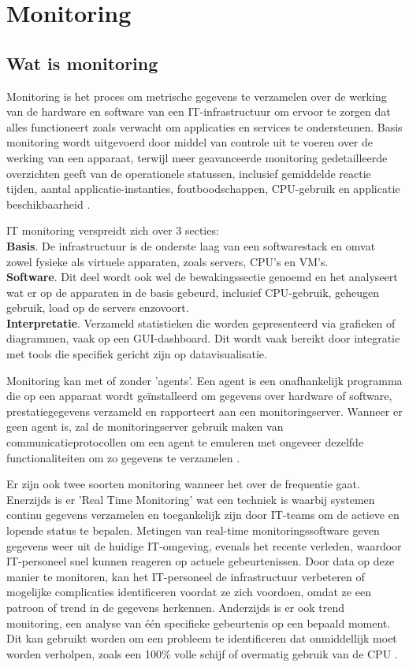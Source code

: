 \section{Monitoring}
\subsection{Wat is monitoring}
Monitoring is het proces om metrische gegevens te verzamelen over de werking van de hardware en software van een IT-infrastructuur om ervoor te zorgen dat alles functioneert zoals verwacht om applicaties en services te ondersteunen. Basis monitoring wordt uitgevoerd door middel van controle uit te voeren over de werking van een apparaat, terwijl meer geavanceerde monitoring gedetailleerde overzichten geeft van de operationele statussen, inclusief gemiddelde reactie tijden, aantal applicatie-instanties, foutboodschappen, CPU-gebruik en applicatie beschikbaarheid \autocite{TechTarget2020}.

IT monitoring verspreidt zich over 3 secties:\\
\textbf{Basis}. De infrastructuur is de onderste laag van een softwarestack en omvat zowel fysieke als virtuele apparaten, zoals servers, CPU's en VM's. \\
\textbf{Software}. Dit deel wordt ook wel de bewakingssectie genoemd en het analyseert wat er op de apparaten in de basis gebeurd, inclusief CPU-gebruik, geheugen gebruik, load op de servers enzovoort.\\
\textbf{Interpretatie}. Verzameld statistieken die worden gepresenteerd via grafieken of diagrammen, vaak op een GUI-dashboard. Dit wordt vaak bereikt door integratie met tools die specifiek gericht zijn op datavisualisatie.

Monitoring kan met of zonder 'agents'. Een agent is een onafhankelijk programma die op een apparaat wordt geïnstalleerd om gegevens over hardware of software, prestatiegegevens verzameld en rapporteert aan een monitoringserver. Wanneer er geen agent is, zal de monitoringserver gebruik maken van communicatieprotocollen om een agent te emuleren met ongeveer dezelfde functionaliteiten om zo gegevens te verzamelen \autocite{TechTarget2020}.

Er zijn ook twee soorten monitoring wanneer het over de frequentie gaat. Enerzijds is er 'Real Time Monitoring' wat een techniek is waarbij systemen continu gegevens verzamelen en toegankelijk zijn door IT-teams om de actieve en lopende status te bepalen. Metingen van real-time monitoringssoftware geven gegevens weer uit de huidige IT-omgeving, evenals het recente verleden, waardoor IT-personeel snel kunnen reageren op actuele gebeurtenissen. Door data op deze manier te monitoren, kan het IT-personeel de infrastructuur verbeteren of mogelijke complicaties identificeren voordat ze zich voordoen, omdat ze een patroon of trend in de gegevens herkennen. Anderzijds is er ook trend monitoring, een analyse van één specifieke gebeurtenis op een bepaald moment. Dit kan gebruikt worden om een probleem te identificeren dat onmiddellijk moet worden verholpen, zoals een 100\% volle schijf of overmatig gebruik van de CPU \autocite{TechTarget2020}.

